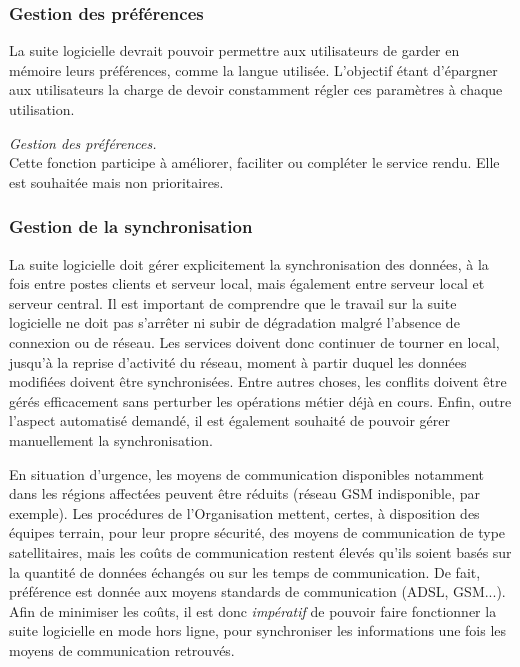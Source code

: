 \subsubsection{Gestion des préférences}
La suite logicielle devrait pouvoir permettre aux utilisateurs de garder en mémoire leurs préférences, comme la langue utilisée. L'objectif étant d'épargner aux utilisateurs la charge de devoir constamment régler ces paramètres à chaque utilisation.
\begin{notation}
\emph{Gestion des préférences.}
\\
Cette fonction participe à améliorer, faciliter ou compléter le service rendu. Elle est souhaitée mais non prioritaires.
\end{notation}

\subsubsection{Gestion de la synchronisation}
La suite logicielle doit gérer explicitement la synchronisation des données, à la fois entre postes clients et serveur local, mais également entre serveur local et serveur central. Il est important de comprendre que le travail sur la suite logicielle ne doit pas s'arrêter ni subir de dégradation malgré l'absence de connexion ou de réseau. Les services doivent donc continuer de tourner en local, jusqu'à la reprise d'activité du réseau, moment à partir duquel les données modifiées doivent être synchronisées. Entre autres choses, les conflits doivent être gérés efficacement sans perturber les opérations métier déjà en cours. Enfin, outre l'aspect automatisé demandé, il est également souhaité de pouvoir gérer manuellement la synchronisation.
\begin{constraint}
En situation d'urgence, les moyens de communication disponibles notamment dans les régions affectées peuvent être \og{}réduits\fg{} (réseau GSM indisponible, par exemple). Les procédures de l'Organisation mettent, certes, à disposition des équipes terrain, pour leur propre sécurité, des moyens de communication de type satellitaires, mais les coûts de communication restent élevés qu'ils soient basés sur la quantité de données échangés ou sur les temps de communication. De fait, préférence est donnée aux moyens \og{}standards\fg{} de communication (ADSL, GSM...). Afin de minimiser les coûts, il est donc \emph{impératif} de pouvoir faire fonctionner la suite logicielle en mode \og{}hors ligne\fg{}, pour synchroniser les informations une fois les moyens de communication retrouvés.
\end{constraint}

